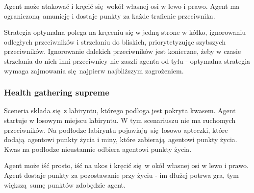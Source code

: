 Agent może atakować i kręcić się wokół własnej osi w lewo i prawo. Agent ma ograniczoną amunicję i dostaje punkty za każde trafienie przeciwnika.

Strategia optymalna polega na kręceniu się w jedną strone w kółko, ignorowaniu odległych przeciwników i strzelaniu do bliskich, priorytetyzując szybszych przeciwników. Ignorowanie dalekich przeciwników jest konieczne, żeby w czasie strzelania do nich inni przeciwnicy nie zaszli agenta od tyłu - optymalna strategia wymaga zajmowania się najpierw najbliższym zagrożeniem.

\begin{figure}[H]
	\begin{floatrow}
	\end{floatrow}
\end{figure}


\subsubsection{Health gathering supreme}\label{scenario_hgs}
Sceneria składa się z labiryntu, którego podłoga jest pokryta kwasem. Agent startuje w losowym miejscu labiryntu. W tym scenariuszu nie ma ruchomych przeciwników. Na podłodze labiryntu pojawiają się losowo apteczki, które dodają agentowi punkty życia i miny, które zabierają agentowi punkty życia. Kwas na podłodze nieustannie odbiera agentowi punkty życia. 

Agent może iść prosto, iść na ukos i kręcić się w okół własnej osi w lewo i prawo. Agent dostaje punkty za pozostawanie przy życiu - im dłużej potrwa gra, tym większą sumę punktów zdobędzie agent.

